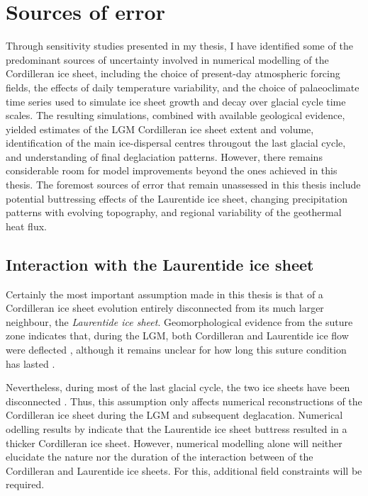 \documentclass[a4paper]{kappa}
\begin{document}
\section{Sources of error}

Through sensitivity studies presented in my thesis, I have identified some of
the predominant sources of uncertainty involved in numerical modelling of the
Cordilleran ice sheet, including the choice of present-day atmospheric forcing
fields, the effects of daily temperature variability, and the choice of
palaeoclimate time series used to simulate ice sheet growth and decay over
glacial cycle
time scales. The resulting simulations, combined with available geological
evidence, yielded estimates of the LGM Cordilleran ice sheet extent and volume,
identification of the main ice-dispersal centres througout the last glacial
cycle, and understanding of final deglaciation patterns. However, there remains
considerable room for model improvements beyond the ones achieved in this
thesis. The foremost sources of error that remain unassessed in this thesis
include potential buttressing effects of the Laurentide ice sheet, changing
precipitation patterns with evolving topography, and regional variability of
the geothermal heat flux.


\subsection{Interaction with the Laurentide ice sheet}

Certainly the most important assumption made in this thesis is that of a
Cordilleran ice sheet evolution entirely disconnected from its much larger
neighbour, the \emph{Laurentide ice sheet}. Geomorphological evidence from the
suture zone indicates that, during the LGM, both Cordilleran and Laurentide ice
flow were deflected \citep{Kleman.etal.2010, Margold.etal.2013,
Margold.etal.2013a}, although it remains unclear for how long this suture
condition has lasted \citep{Jackson.etal.1997, Bednarski.Smith.2007,
Gowan.2013}.

Nevertheless, during most of the last glacial cycle, the two ice sheets have
been disconnected \citep{Kleman.etal.2010}. Thus, this assumption only affects
numerical reconstructions of the Cordilleran ice sheet during the LGM and
subsequent deglacation. Numerical odelling results by
\citet{Gregoire.etal.2012} indicate that the Laurentide ice sheet buttress
resulted in a thicker Cordilleran ice sheet. However, numerical modelling alone
will neither elucidate the
nature nor the duration of the interaction between of the Cordilleran and
Laurentide ice sheets. For this, additional field constraints will be required.
\end{document}
